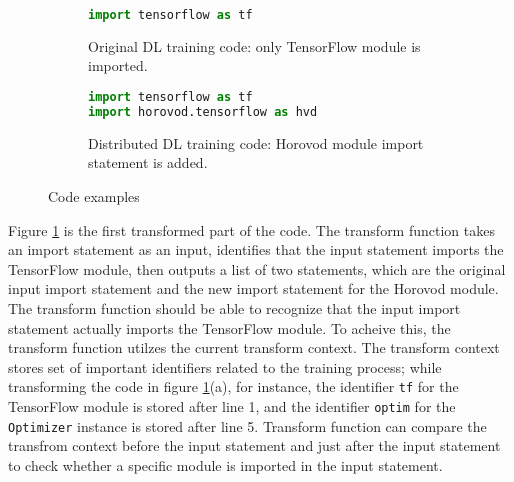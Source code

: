 \begin{figure}[ht!]
  \centering

  \begin{subfigure}[t]{0.48\textwidth}
    \begin{lstlisting}[language=Python]
import tensorflow as tf
    \end{lstlisting}
    \caption{Original DL training code: only TensorFlow module is imported.}
  \end{subfigure}
  \hspace{5mm}
  \begin{subfigure}[t]{0.48\textwidth}
    \begin{lstlisting}[language=Python]
import tensorflow as tf
import horovod.tensorflow as hvd
    \end{lstlisting}
    \caption{Distributed DL training code: Horovod module import statement is added.}
  \end{subfigure}
  \caption{Code examples}
  \label{fig:trans:ex01}
\end{figure}

Figure \ref{fig:trans:ex01} is the first transformed part of the code.
The transform function takes an import statement as an input,
identifies that the input statement imports the TensorFlow module,
then outputs a list of two statements, which are the original input 
import statement and the new import statement for the Horovod module. 
The transform function should be able to recognize that the input import
statement actually imports the TensorFlow module.
To acheive this, the transform function utilzes the current transform context.
The transform context stores set of important identifiers related to the
training process; while transforming the code in figure \ref{fig:trans:ex01}(a),
for instance, the identifier {\tt tf} for the TensorFlow
module is stored after line 1, and the identifier {\tt optim}
for the {\tt Optimizer} instance is stored after line 5.
Transform function can compare the transfrom context before the input statement
and just after the input statement to check whether a specific module
is imported in the input statement.

